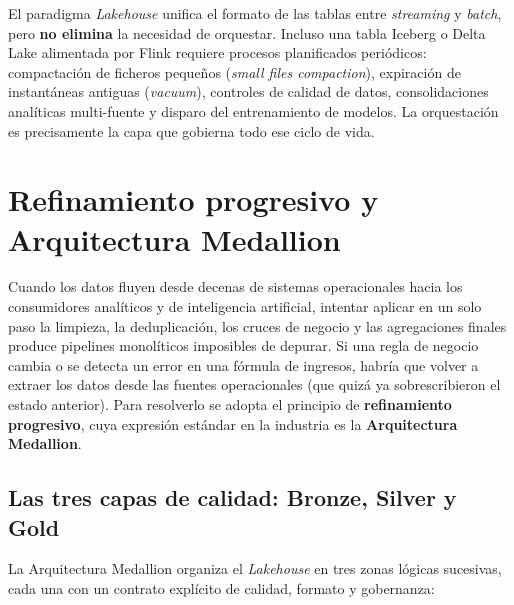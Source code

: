 \begin{infobox}
El paradigma \textit{Lakehouse} unifica el formato de las tablas entre \textit{streaming} y \textit{batch}, pero \textbf{no elimina} la necesidad de orquestar. Incluso una tabla Iceberg o Delta Lake alimentada por Flink requiere procesos planificados periódicos: compactación de ficheros pequeños (\textit{small files compaction}), expiración de instantáneas antiguas (\textit{vacuum}), controles de calidad de datos, consolidaciones analíticas multi-fuente y disparo del entrenamiento de modelos. La orquestación es precisamente la capa que gobierna todo ese ciclo de vida.
\end{infobox}

\section{Refinamiento progresivo y Arquitectura Medallion}\label{sec:medallion}

Cuando los datos fluyen desde decenas de sistemas operacionales hacia los consumidores analíticos y de inteligencia artificial, intentar aplicar en un solo paso la limpieza, la deduplicación, los cruces de negocio y las agregaciones finales produce pipelines monolíticos imposibles de depurar. Si una regla de negocio cambia o se detecta un error en una fórmula de ingresos, habría que volver a extraer los datos desde las fuentes operacionales (que quizá ya sobrescribieron el estado anterior). Para resolverlo se adopta el principio de \textbf{refinamiento progresivo}, cuya expresión estándar en la industria es la \textbf{Arquitectura Medallion}.

\subsection{Las tres capas de calidad: Bronze, Silver y Gold}\label{subsec:capas-medallion}

La Arquitectura Medallion organiza el \textit{Lakehouse} en tres zonas lógicas sucesivas, cada una con un contrato explícito de calidad, formato y gobernanza:

